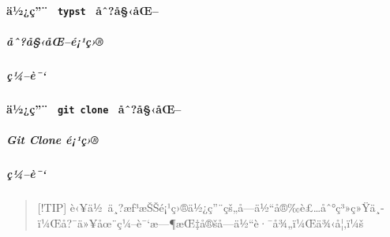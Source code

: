 \paragraph{\texorpdfstring{ä½¿ç''¨ \texttt{\ typst\ }
åˆ?å§‹åŒ--}{ä½¿ç''¨  typst  åˆ?å§‹åŒ--}}\label{uxe4uxbduxe7-typst-uxe5ux2c6uxe5uxe5ux153}

\subparagraph{åˆ?å§‹åŒ--é¡¹ç›®}\label{uxe5ux2c6uxe5uxe5ux153uxe9uxb9uxe7}

\begin{Shaded}
\begin{Highlighting}[]
\end{Highlighting}
\end{Shaded}

\subparagraph{ç¼--è¯`}\label{uxe7uxbcuxe8}

\begin{Shaded}
\begin{Highlighting}[]
\end{Highlighting}
\end{Shaded}

\paragraph{\texorpdfstring{ä½¿ç''¨ \texttt{\ git\ clone\ }
åˆ?å§‹åŒ--}{ä½¿ç''¨  git clone  åˆ?å§‹åŒ--}}\label{uxe4uxbduxe7-git-clone-uxe5ux2c6uxe5uxe5ux153}

\subparagraph{Git Clone é¡¹ç›®}\label{git-clone-uxe9uxb9uxe7}

\begin{Shaded}
\begin{Highlighting}[]
\end{Highlighting}
\end{Shaded}

\subparagraph{ç¼--è¯`}\label{uxe7uxbcuxe8-1}

\begin{Shaded}
\begin{Highlighting}[]
\end{Highlighting}
\end{Shaded}

\begin{quote}
{[}!TIP{]}
è‹¥ä½~ä¸?æƒ³æŠŠé¡¹ç›®ä½¿ç''¨çš„å­---ä½``å®‰è£\ldots åˆ°ç³»ç»Ÿä¸­ï¼Œå?¯ä»¥åœ¨ç¼--è¯`æ---¶æŒ‡å®šå­---ä½``è·¯å¾„ï¼Œä¾‹å¦‚ï¼š

\begin{Shaded}
\begin{Highlighting}[]
\end{Highlighting}
\end{Shaded}
\end{quote}

